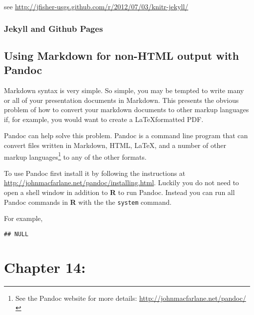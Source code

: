 \documentclass[ChapterTOCs,krantz1]{krantz}\usepackage{graphicx, color}
\makeatletter
\newenvironment{kframe}{%
 \def\at@end@of@kframe{}%
 \ifinner\ifhmode%
  \def\at@end@of@kframe{\end{minipage}}%
  \begin{minipage}{\columnwidth}%
 \fi\fi%
 \def\FrameCommand##1{\hskip\@totalleftmargin \hskip-\fboxsep
 \colorbox{shadecolor}{##1}\hskip-\fboxsep
     \hskip-\linewidth \hskip-\@totalleftmargin \hskip\columnwidth}%
 \MakeFramed {\advance\hsize-\width
   \@totalleftmargin\z@ \linewidth\hsize
   \@setminipage}}%
 {\par\unskip\endMakeFramed%
 \at@end@of@kframe}
\newenvironment{knitrout}{}{} %
\makeatother
\begin{document}
see \url{http://jfisher-usgs.github.com/r/2012/07/03/knitr-jekyll/}

\subsection{Jekyll and Github Pages}

\section{Using Markdown for non-HTML output with Pandoc}

Markdown syntax is very simple. So simple, you may be tempted to write many or all of your presentation documents in Markdown. This presents the obvious problem of how to convert your markdown documents to other markup languages if, for example, you would want to create a \LaTeX formatted PDF. 

Pandoc can help solve this problem. Pandoc is a command line program that can convert files written in Markdown, HTML, \LaTeX, and a number of other markup languages\footnote{See the Pandoc website for more details: {\url{http://johnmacfarlane.net/pandoc/}}} to any of the other formats. 

To use Pandoc first install it by following the instructions at {\url{http://johnmacfarlane.net/pandoc/installing.html}}. Luckily you do not need to open a shell window in addition to {\bf{R}} to run Pandoc. Instead you can run all Pandoc commands in {\bf{R}} with the the {\tt{system}} command. 

For example, 


  

\begin{knitrout}
\color{fgcolor}\begin{kframe}
\begin{verbatim}
## NULL
\end{verbatim}
\end{kframe}
\end{knitrout}


\chapter{Chapter 14:}






\clearpage
\printindex
\end{document}
